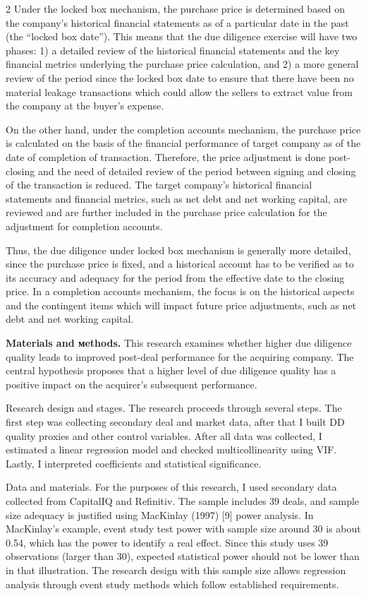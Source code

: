 \begin{multicols}{2}
Under the locked box mechanism, the purchase price is determined based
on the company's historical financial statements as of a particular date
in the past (the ``locked box date''). This means that the due diligence
exercise will have two phases: 1) a detailed review of the historical
financial statements and the key financial metrics underlying the
purchase price calculation, and 2) a more general review of the period
since the locked box date to ensure that there have been no material
leakage transactions which could allow the sellers to extract value from
the company at the buyer's expense.

On the other hand, under the completion accounts mechanism, the purchase
price is calculated on the basis of the financial performance of target
company as of the date of completion of transaction. Therefore, the
price adjustment is done post-closing and the need of detailed review of
the period between signing and closing of the transaction is reduced.
The target company's historical financial statements and financial
metrics, such as net debt and net working capital, are reviewed and are
further included in the purchase price calculation for the adjustment
for completion accounts.

Thus, the due diligence under locked box mechanism is generally more
detailed, since the purchase price is fixed, and a historical account
has to be verified as to its accuracy and adequacy for the period from
the effective date to the closing price. In a completion accounts
mechanism, the focus is on the historical aspects and the contingent
items which will impact future price adjustments, such as net debt and
net working capital.

{\bfseries Materials and мethods.} This research examines whether higher
due diligence quality leads to improved post-deal performance for the
acquiring company. The central hypothesis proposes that a higher level
of due diligence quality has a positive impact on the acquirer's
subsequent performance.

Research design and stages. The research proceeds through several steps.
The first step was collecting secondary deal and market data, after that
I built DD quality proxies and other control variables. After all data
was collected, I estimated a linear regression model and checked
multicollinearity using VIF. Lastly, I interpreted coefficients and
statistical significance.

Data and materials. For the purposes of this research, I used secondary
data collected from CapitalIQ and Refinitiv. The sample includes 39
deals, and sample size adequacy is justified using MacKinlay (1997)
{[}9{]} power analysis. In MacKinlay's example, event study test power
with sample size around 30 is about 0.54, which has the power to
identify a real effect. Since this study uses 39 observations (larger
than 30), expected statistical power should not be lower than in that
illustration. The research design with this sample size allows
regression analysis through event study methods which follow established
requirements.


\end{multicols}
